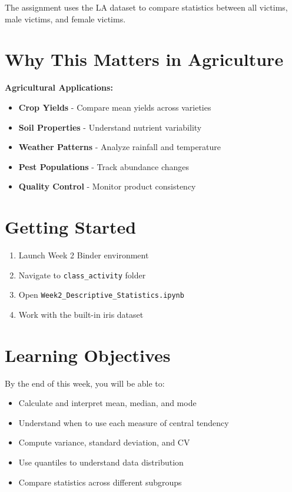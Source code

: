\documentclass[11pt,a4paper]{article}
\begin{document}
The assignment uses the LA dataset to compare statistics between all victims, male victims, and female victims.

\section{Why This Matters in Agriculture}

\begin{infobox}
\textbf{Agricultural Applications:}
\begin{itemize}
    \item \textbf{Crop Yields} - Compare mean yields across varieties
    \item \textbf{Soil Properties} - Understand nutrient variability
    \item \textbf{Weather Patterns} - Analyze rainfall and temperature
    \item \textbf{Pest Populations} - Track abundance changes
    \item \textbf{Quality Control} - Monitor product consistency
\end{itemize}
\end{infobox}

\section{Getting Started}

\begin{enumerate}
    \item Launch Week 2 Binder environment
    \item Navigate to \texttt{class\_activity} folder
    \item Open \texttt{Week2\_Descriptive\_Statistics.ipynb}
    \item Work with the built-in iris dataset
\end{enumerate}

\section{Learning Objectives}

By the end of this week, you will be able to:
\begin{itemize}
    \item Calculate and interpret mean, median, and mode
    \item Understand when to use each measure of central tendency
    \item Compute variance, standard deviation, and CV
    \item Use quantiles to understand data distribution
    \item Compare statistics across different subgroups
\end{itemize}
\end{document}
